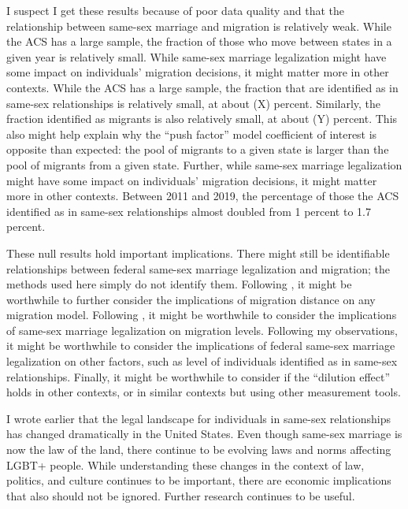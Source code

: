 \documentclass[12pt,letterpaper]{article}
\begin{document}
I suspect I get these results because of poor data quality and that the relationship between same-sex marriage and migration is relatively weak. While the ACS has a large sample, the fraction of those who move between states in a given year is relatively small. While same-sex marriage legalization might have some impact on individuals’ migration decisions, it might matter more in other contexts. While the ACS has a large sample, the fraction that are identified as in same-sex relationships is relatively small, at about (X) percent. Similarly, the fraction identified as migrants is also relatively small, at about (Y) percent. This also might help explain why the “push factor” model coefficient of interest is opposite than expected: the pool of migrants to a given state is larger than the pool of migrants from a given state. Further, while same-sex marriage legalization might have some impact on individuals’ migration decisions, it might matter more in other contexts. Between 2011 and 2019, the percentage of those the ACS identified as in same-sex relationships almost doubled from 1 percent to 1.7 percent.

These null results hold important implications. There might still be identifiable relationships between federal same-sex marriage legalization and migration; the methods used here simply do not identify them. Following \citet{1, 12}, it might be worthwhile to further consider the implications of migration distance on any migration model. Following \citet{15}, it might be worthwhile to consider the implications of same-sex marriage legalization on migration levels. Following my observations, it might be worthwhile to consider the implications of federal same-sex marriage legalization on other factors, such as level of individuals identified as in same-sex relationships. Finally, it might be worthwhile to consider if the “dilution effect” holds in other contexts, or in similar contexts but using other measurement tools.

I wrote earlier that the legal landscape for individuals in same-sex relationships has changed dramatically in the United States. Even though same-sex marriage is now the law of the land, there continue to be evolving laws and norms affecting LGBT+ people. While understanding these changes in the context of law, politics, and culture continues to be important, there are economic implications that also should not be ignored. Further research continues to be useful.

\newpage


\end{document}
